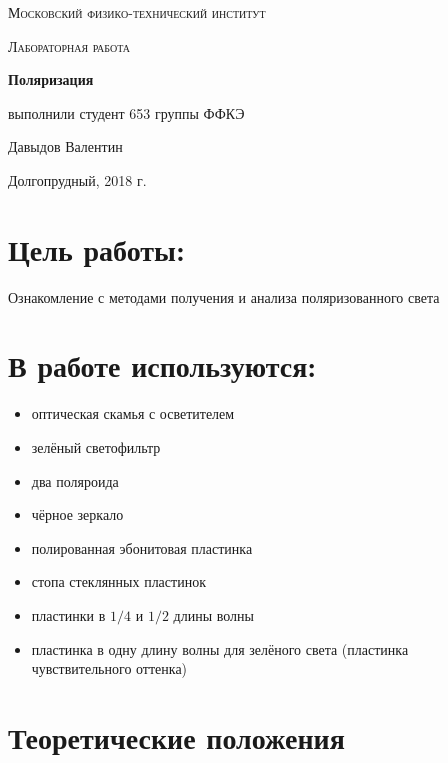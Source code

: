 \documentclass[a4paper]{article}
\begin{document}
\begin{titlepage}
	\centering
	\vspace{5cm}
	{\scshape\LARGE Московский физико-технический институт \par}
	\vspace{4cm}
	{\scshape\Large Лабораторная работа \par}
	\vspace{1cm}
	{\huge\bfseries Поляризация \par}
	\vspace{1cm}
	\vfill
\begin{flushright}
	{\large выполнили студент 653 группы ФФКЭ}\par
	\vspace{0.3cm}
	{\LARGE Давыдов Валентин} \par
		\vspace{0.3cm}
	{\LARGE }
\end{flushright}
	

	\vfill

	Долгопрудный, 2018 г.
\end{titlepage}

\section{Цель работы:}
Ознакомление с методами получения и анализа поляризованного света

\section{В работе используются:}
\begin{itemize}
    \item оптическая скамья с осветителем
    \item зелёный светофильтр
    \item два поляроида
    \item чёрное зеркало
    \item полированная эбонитовая пластинка
    \item стопа стеклянных пластинок
    \item пластинки в $1/4$ и $1/2$ длины волны
    \item пластинка в одну длину волны для зелёного света (пластинка чувствительного оттенка)
\end{itemize}

\section{Теоретические положения}
\end{document}
